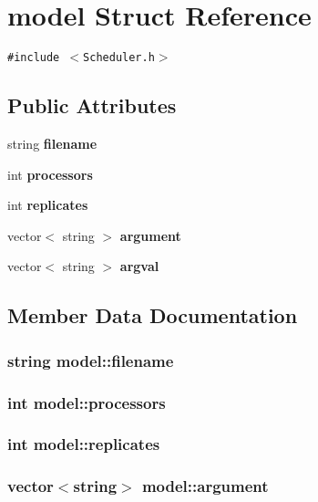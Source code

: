 \section{model Struct Reference}
\label{structmodel}
{\tt \#include $<$Scheduler.h$>$}

\subsection*{Public Attributes}
\begin{CompactItemize}
\item 
string {\bf filename}
\item 
int {\bf processors}
\item 
int {\bf replicates}
\item 
vector$<$ string $>$ {\bf argument}
\item 
vector$<$ string $>$ {\bf argval}
\end{CompactItemize}


\subsection{Member Data Documentation}
\subsubsection{\setlength{\rightskip}{0pt plus 5cm}string {\bf model::filename}}\label{structmodel_d6cd761e22f412ec02304bfc1a6c797d}


\subsubsection{\setlength{\rightskip}{0pt plus 5cm}int {\bf model::processors}}\label{structmodel_e441c5e7f4f3c31f294fb1169a823486}


\subsubsection{\setlength{\rightskip}{0pt plus 5cm}int {\bf model::replicates}}\label{structmodel_38f87a0f851eb51fb1a6f83dc974ef9d}


\subsubsection{\setlength{\rightskip}{0pt plus 5cm}vector$<$string$>$ {\bf model::argument}}\label{structmodel_a81ad333cefe9e2bfe7f5424fd9a3f54}


